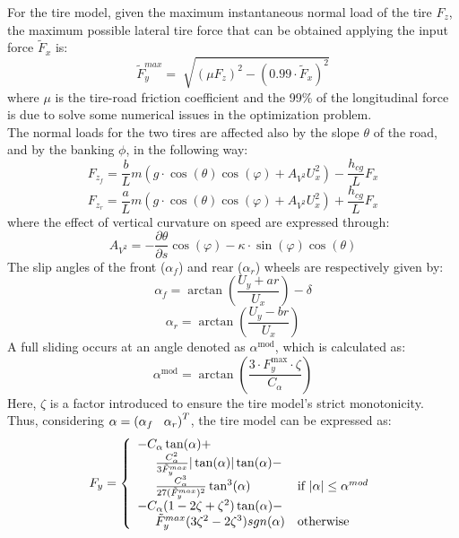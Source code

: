 \documentclass[a4paper, onecolumn, 11pt, twoside]{article}
\newcommand\tab[1][.3cm]{\hspace*{#1}}
\newcommand\tabeq[1][.5cm]{\hspace*{#1}}
\begin{document}
For the tire model, given the maximum instantaneous normal load of the tire $F_z$, the maximum possible
lateral tire force that can be obtained applying the input force $\tilde{F}_x$ is:
\begin{equation}
    \tilde{F}_y^{max} = \sqrt[]{(\mu F_z)^2 - (0.99\cdot \tilde{F}_x)^2}
\end{equation}
where $\mu$ is the tire-road friction coefficient and the 99\%  of the longitudinal force is due to solve 
some numerical issues in the optimization problem. \\
The normal loads for the two tires are affected also by the slope $\theta$ of the road, and by the banking $\phi$, in the following way:
\begin{equation}
    \label{normalF}
    F_{z_f} = \frac{b}{L}m(g\cdot \cos(\theta)\cos(\varphi)+A_{V^2}U_x^2)-\frac{h_{cg}}{L}F_x
\end{equation}
\begin{equation}
    \label{normalR}
    F_{z_r} = \frac{a}{L}m(g\cdot \cos(\theta)\cos(\varphi)+A_{V^2}U_x^2)+\frac{h_{cg}}{L}F_x
\end{equation}
where the effect of vertical curvature on speed are expressed through:
\begin{equation}
    A_{V^2} = -\frac{\partial \theta}{\partial s}\cos(\varphi)-\kappa\cdot \sin(\varphi)\cos(\theta) 
\end{equation}
The slip angles of the front ($\alpha_f$) and rear ($\alpha_r$) wheels are respectively given by:
\begin{equation}
    \alpha_f = \arctan \left(\frac{U_y+ar}{U_x}\right)-\delta
\end{equation}
\begin{equation}
    \alpha_r = \arctan \left(\frac{U_y-br}{U_x}\right)
\end{equation}
A full sliding occurs at an angle denoted as $\alpha^{\text{mod}}$, which is calculated as:
\begin{equation}
    \alpha^{\text{mod}} = \arctan\left(\frac{3\cdot F_y^{\text{max}}\cdot\zeta}{C_{\alpha}}\right)
\end{equation}
Here, $\zeta$ is a factor introduced to ensure the tire model's strict monotonicity.\\
Thus, considering $\alpha = \left(\alpha_f \tab \alpha_r\right)^T$, the tire model can
be expressed as:
\begin{equation}
    F_y = 
    \left\{
	\begin{array}{ll}
		-C_\alpha \tan(\alpha)+&\\
        \tabeq\frac{C_\alpha^2}{3\tilde{F}_y^{max}}|\tan(\alpha)|\tan(\alpha) - &\\
        \tabeq\frac{C_\alpha^3}{27(\tilde{F}_{y}^{max})^2}\tan^3(\alpha) 
        & \mbox{if } |\alpha| \leq \alpha^{mod} \\
		-C_{\alpha}(1-2\zeta+\zeta^2)\tan(\alpha)-&\\
        \tabeq \tilde{F}_y^{max}(3\zeta^2-2\zeta^3){sgn(\alpha)}
        & \mbox{otherwise }
	\end{array}
    \right.
\end{equation}
\end{document}
